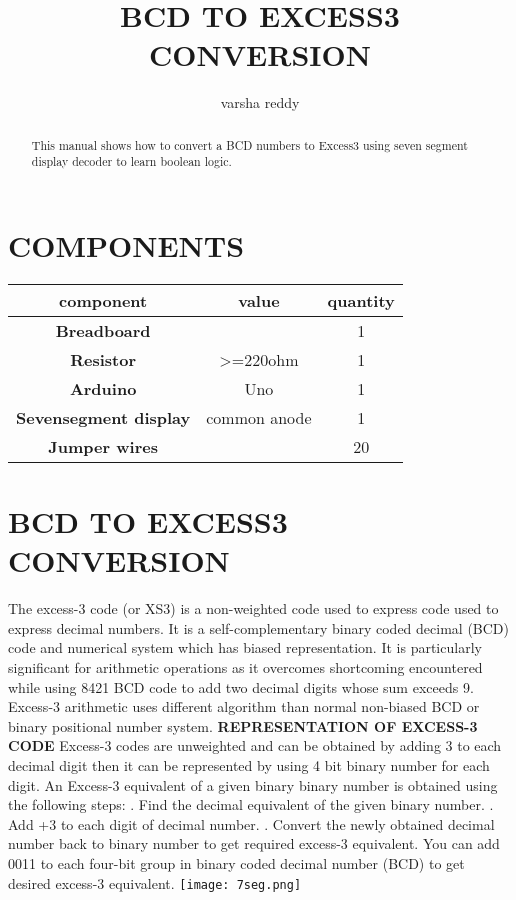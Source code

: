 \documentclass{article}
\title{\textbf {BCD TO EXCESS3 CONVERSION}}
\author{varsha reddy}
\begin{document}
\maketitle
\begin{tableofcontents}
\begin{abstract}
This manual shows how to convert a BCD numbers to Excess3 using seven segment display decoder to learn boolean logic.
\end{abstract}
\section{COMPONENTS}
\begin{tabular}{|c||c||c|}
\hline
\textbf{component} & {value} & {quantity} \\
\hline
 \textbf{Breadboard}  &  &  1  \\
 \hline
 \textbf{Resistor}  & {>=220ohm} & {1} \\
 \hline
 \textbf{Arduino} & {Uno} & 1\\
 \hline
 \textbf{Sevensegment display} & {common anode} & {1}\\
 \hline
 \textbf{Jumper wires} &   &  {20}\\
 \hline
\end{tabular}
\newline
\section{BCD TO EXCESS3 CONVERSION}
The excess-3 code (or XS3) is a non-weighted code used to express code used to express decimal numbers. It is a self-complementary binary coded decimal (BCD) code and numerical system which has biased representation. It is particularly significant for arithmetic operations as it overcomes shortcoming encountered while using 8421 BCD code to add two decimal digits whose sum exceeds 9. Excess-3 arithmetic uses different algorithm than normal non-biased BCD or binary positional number system.
\newline
\newline
\textbf{REPRESENTATION OF EXCESS-3 CODE}
\newline
\newline
Excess-3 codes are unweighted and can be obtained by adding 3 to each decimal digit then it can be represented by using 4 bit binary number for each digit. An Excess-3 equivalent of a given binary binary number is obtained using the following steps:
. Find the decimal equivalent of the given binary number.
. Add +3 to each digit of decimal number.
. Convert the newly obtained decimal number back to binary number to get required excess-3 equivalent.
\newline
   You can add 0011 to each four-bit group in binary coded decimal number (BCD) to get desired excess-3 equivalent.
\newline
\newline
{\texttt{[image: 7seg.png]} } 


\end{tableofcontents}
\end{document}

